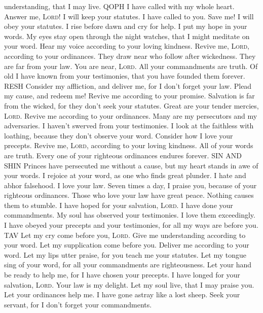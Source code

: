 understanding, that I may live. QOPH  I have called with
my whole heart. Answer me, \textsc{Lord}! I will keep your statutes.
 I have called to you. Save me! I will obey your
statutes.  I rise before dawn and cry for help. I put my
hope in your words.  My eyes stay open through the night
watches, that I might meditate on your word.  Hear my
voice according to your loving kindness. Revive me, \textsc{Lord},
according to your ordinances.  They draw near who follow
after wickedness. They are far from your law.  You are
near, \textsc{Lord}. All your commandments are truth. 
Of old I have known from your testimonies, that you have founded them
forever. RESH  Consider my affliction, and deliver me,
for I don't forget your law.  Plead my cause, and redeem
me! Revive me according to your promise.  Salvation is
far from the wicked, for they don't seek your statutes. 
Great are your tender mercies, \textsc{Lord}. Revive me according to
your ordinances.  Many are my persecutors and my
adversaries. I haven't swerved from your testimonies.  I
look at the faithless with loathing, because they don't observe your
word.  Consider how I love your precepts. Revive me,
\textsc{Lord}, according to your loving kindness.  All
of your words are truth. Every one of your righteous ordinances endures
forever. SIN AND SHIN  Princes have persecuted me
without a cause, but my heart stands in awe of your words.
 I rejoice at your word, as one who finds great plunder.
 I hate and abhor falsehood. I love your law.
 Seven times a day, I praise you, because of your
righteous ordinances.  Those who love your law have
great peace. Nothing causes them to stumble.  I have
hoped for your salvation, \textsc{Lord}. I have done your commandments.
 My soul has observed your testimonies. I love them
exceedingly.  I have obeyed your precepts and your
testimonies, for all my ways are before you. TAV  Let my
cry come before you, \textsc{Lord}. Give me understanding according to
your word.  Let my supplication come before you. Deliver
me according to your word.  Let my lips utter praise,
for you teach me your statutes.  Let my tongue sing of
your word, for all your commandments are righteousness. 
Let your hand be ready to help me, for I have chosen your precepts.
 I have longed for your salvation, \textsc{Lord}. Your
law is my delight.  Let my soul live, that I may praise
you. Let your ordinances help me.  I have gone astray
like a lost sheep. Seek your servant, for I don't forget your
commandments.

